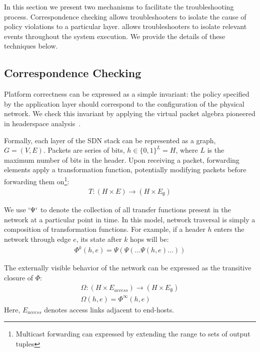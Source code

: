 In this section we present two mechanisms to facilitate the troubleshooting
process. Correspondence checking allows troubleshooters to isolate
the cause of policy violations to a particular layer. \Simulator{}
allows troubleshooters to isolate relevant events throughout the system
execution. We provide the details of these techniques below. 

\subsection{Correspondence Checking}

 

Platform correctness can be expressed as a simple invariant:
the policy specified by the application layer should correspond to the
configuration of the
physical network. We check this invariant by applying the virtual packet
algebra pioneered in headerspace analysis~\cite{hsa}. 

Formally, each layer of the SDN stack can be represented as a graph,
$G = (V, E)$. Packets are series of bits, $h \in \{0,1\}^L = H$,
where $L$ is the maximum number of bits in the header. Upon receiving a packet,
forwarding elements apply a transformation function, potentially modifying
packets before forwarding them on\footnote{Multicast forwarding can expressed
by extending the range to sets of output tuples}:
\begin{align*}
T: (H \times E) \rightarrow (H \times E_{\emptyset})
\end{align*}

We use $`\Psi`$ to denote the collection of all transfer functions present in
the network at a particular point in time. In this model, network traversal is simply a composition of transformation
functions. For example, if a header $h$ enters the network through edge
$e$, its state after $k$ hops will be:
\begin{align*}
\Phi^k(h,e) = \Psi(\Psi(\dots \Psi(h,e)\dots))
\end{align*}

The externally visible behavior of the network can be expressed as the
transitive closure of $\Phi$:
\begin{align*}
\Omega: (H \times E_{access}) \rightarrow (H \times E_{\emptyset}) \\
\Omega(h,e) = \Phi^{\infty}(h,e)
\end{align*}
Here, $E_{access}$ denotes access links adjacent to end-hosts.

